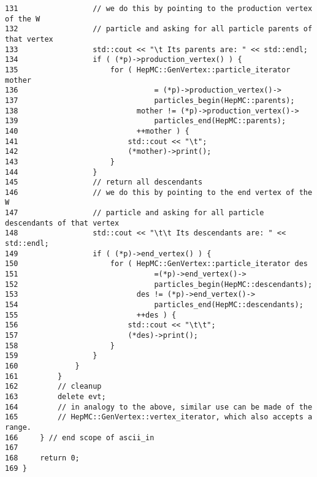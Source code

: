 \begin{DocInclude}
\begin{verbatim}
131                 // we do this by pointing to the production vertex of the W 
132                 // particle and asking for all particle parents of that vertex
133                 std::cout << "\t Its parents are: " << std::endl;
134                 if ( (*p)->production_vertex() ) {
135                     for ( HepMC::GenVertex::particle_iterator mother 
136                               = (*p)->production_vertex()->
137                               particles_begin(HepMC::parents);
138                           mother != (*p)->production_vertex()->
139                               particles_end(HepMC::parents); 
140                           ++mother ) {
141                         std::cout << "\t";
142                         (*mother)->print();
143                     }
144                 }
145                 // return all descendants
146                 // we do this by pointing to the end vertex of the W 
147                 // particle and asking for all particle descendants of that vertex
148                 std::cout << "\t\t Its descendants are: " << std::endl;
149                 if ( (*p)->end_vertex() ) {
150                     for ( HepMC::GenVertex::particle_iterator des 
151                               =(*p)->end_vertex()->
152                               particles_begin(HepMC::descendants);
153                           des != (*p)->end_vertex()->
154                               particles_end(HepMC::descendants);
155                           ++des ) {
156                         std::cout << "\t\t";
157                         (*des)->print();
158                     }
159                 }
160             }
161         }
162         // cleanup
163         delete evt;
164         // in analogy to the above, similar use can be made of the
165         // HepMC::GenVertex::vertex_iterator, which also accepts a range.
166     } // end scope of ascii_in
167 
168     return 0;
169 }
\end{verbatim}
\end{DocInclude}
 